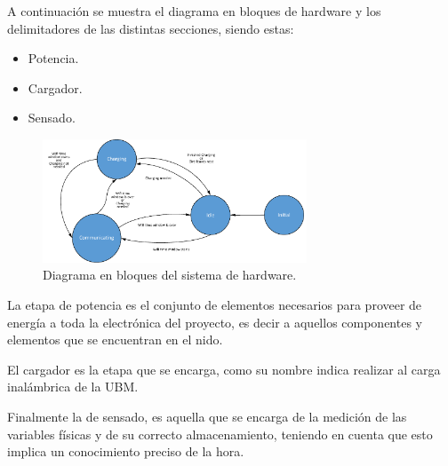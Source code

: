 A continuación se muestra el diagrama en bloques de hardware y los delimitadores de las distintas secciones, siendo estas:
\begin{itemize}
\item Potencia.
\item Cargador.
\item Sensado.
\end{itemize}

\begin{figure}[H]
	\centering
	\includegraphics[width=0.7\textwidth, page=7]{ImagenesIngenieria de Detalle/FlowChart.pdf}		
	\caption{Diagrama en bloques del sistema de hardware.}
	\label{fig:diagrama_hardware}
\end{figure}

La etapa de potencia es el conjunto de elementos necesarios para proveer de energía a toda la electrónica del proyecto, es decir a aquellos componentes y elementos que se encuentran en el nido.

El cargador es la etapa que se encarga, como su nombre indica realizar al carga inalámbrica de la UBM.

Finalmente la de sensado, es aquella que se encarga de la medición de las variables físicas y de su correcto almacenamiento, teniendo en cuenta que esto implica un conocimiento preciso de la hora.